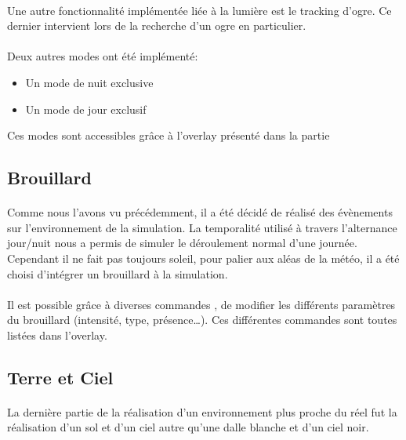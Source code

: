 \paragraph{}
Une autre fonctionnalité implémentée liée à la lumière est le tracking d'ogre.
Ce dernier intervient lors de la recherche d'un ogre en particulier.


\paragraph{}
Deux autres modes ont été implémenté:\\
\begin{itemize}
  \item Un mode de nuit exclusive
  \item Un mode de jour exclusif\\
\end{itemize}

Ces modes sont accessibles grâce à l'overlay présenté dans la partie %

\subsection{Brouillard}

\paragraph{}
Comme nous l'avons vu précédemment, il a été décidé de réalisé des évènements
sur l'environnement de la simulation. La temporalité utilisé à travers
l'alternance jour/nuit nous a permis de simuler le déroulement normal d'une
journée. Cependant il ne fait pas toujours soleil, pour palier aux aléas de la
météo, il a été choisi d'intégrer un brouillard à la simulation.

\paragraph{}
Il est possible grâce à diverses commandes , de modifier les différents
paramètres du brouillard (intensité, type, présence\ldots). Ces différentes
commandes sont toutes listées dans l'overlay. 


\subsection{Terre et Ciel}

\paragraph{}
La dernière partie de la réalisation d'un environnement plus proche du réel fut
la réalisation d'un sol et d'un ciel autre qu'une dalle blanche et d'un ciel
noir.

